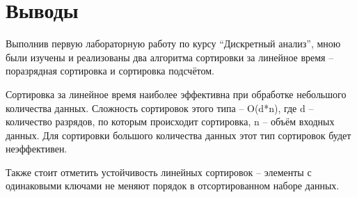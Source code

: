 \section{Выводы}

Выполнив первую лабораторную работу по курсу \enquote{Дискретный анализ}, мною были изучены и реализованы два алгоритма сортировки за линейное время – поразрядная сортировка и сортировка подсчётом.

Сортировка за линейное время наиболее эффективна при обработке небольшого количества данных. Сложность сортировок этого типа – O(d*n), где d – количество разрядов, по которым происходит сортировка, n – объём входных данных. Для сортировки большого количества данных этот тип сортировок будет неэффективен.

Также стоит отметить устойчивость линейных сортировок – элементы с одинаковыми ключами не меняют порядок в отсортированном наборе данных.

\pagebreak